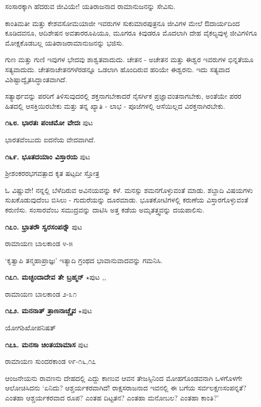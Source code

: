 {ಸಂಸಾರಕ್ಕಾಗಿ ಹೆದರುವ ಜೀವಿಯೇ! ಯತಿರಾಜನಾದ ರಾಮಾನುಜನನ್ನು ಸೇವಿಸು.

ಕಾಂತಿಮತೀ ಮತ್ತು ಕೇಶವಸೋಮಯಾಜೀ ಇವರುಗಳ ಸುಕುಮಾರಪುತ್ರನೂ ಜೀವಿಗಳ ಮೇಲೆ ಔದಾರ್ಯದಿಂದ ಕೂಡಿದವನೂ, ಆದಿಶೇಷನ ಅವತಾರರೂಪಿಯೂ, ಮೂಗರೂ ಕಿವುಡರೂ ಮೊದಲಾಗಿ ದೇಹ ವೈಕಲ್ಯವುಳ್ಳ ಜೀವಿಗಳಿಗೂ ಮೋಕ್ಷಕೊಡಬಲ್ಲ ಯತಿರಾಜರಾಮಾನುಜನನ್ನು ಭಜಿಸು.

ಗುಣ ಮತ್ತು ಗುಣಿ ಇವುಗಳ ಭೇದವು ಶಾಶ್ವತವಾದುದು. ಚೇತನ - ಅಚೇತನ ಮತ್ತು ಈಶ್ವರ ಇವರುಗಳ ಭಿನ್ನತೆಯೂ ಸತ್ಯವಾದುದು. ಚೇತನಾಚೇತನಗಳೆರಡನ್ನೂ ಒಡಲಾಗಿ ಹೊಂದಿರುವ ಹರಿಯೇ ಈಶ್ವರನು. ಇದು ಸತ್ಯವಾದ ವಿಶಿಷ್ಟಾದ್ವೈತಸಿದ್ಧಾಂತವಾಗಿದೆ.

ಸತ್ಯಾರ್ಥವನ್ನು ಪರರಿಗೆ ತಿಳಿಸುವುದರಲ್ಲಿ ಶಕ್ತನಾಗಬೇಕಾದರೆ ನೈಸರ್ಗಿಕ ಪ್ರಜ್ಞಾವಂತನಾಗಬೇಕು, ಅಂತೆಯೇ ಪರರ ಹಿತದಲ್ಲಿ ಆಸಕ್ತಿಯಿರಬೇಕು ಮತ್ತು ತನ್ನ ಖ್ಯಾತಿ - ಲಾಭ - ಪೂಜೆಗಳಲ್ಲಿ ಆಸೆಯಿಲ್ಲದ ವಿರಕ್ತನಾಗಿರಬೇಕು.

\medskip
\noindent\textbf{೧೬೮. ಭಾರತಃ ಪಂಚಮೋ ವೇದಃ} \hfill ಪುಟ \pageref{122}

ಭಾರತವೆಂಬುದು ಐದನೆಯ ವೇದವಾಗಿದೆ.

\medskip
\noindent\textbf{೧೬೯. ಭೂತದಯಾಂ ವಿಸ್ತಾರಯ} \hfill ಪುಟ \pageref{115b}

\hfill ಶ್ರೀಶಂಕರರಭಗವತ್ಪಾದ ಕೃತ ಷಟ್ಪದೀ ಸ್ತೋತ್ರ

ಓ ವಿಷ್ಣುವೇ! ನನ್ನಲ್ಲಿ ಬೆಳೆದಿರುವ ಅವಿನಯವನ್ನು ಕಳೆ. ಮನಸ್ಸು ಶಮನಗೊಳ್ಳುವಂತೆ ಮಾಡು. ಶಬ್ದಾದಿ ವಿಷಯಗಳು ಸುಖಕೊಡುವುದೆಂಬ ಬಿಸಿಲು - ಗುದುರೆಯನ್ನು ದೂರಮಾಡು. ಭೂತಕೋಟಿಗಳಲ್ಲಿ ಕರುಣೆಯ ವಿಸ್ತಾರಗೊಳ್ಳುವಂತೆ ಕರುಣಿಸು. ಸಂಸಾರವೆಂಬ ಸಮುದ್ರವನ್ನು ದಾಟಿಸಿ ಅತ್ತ ಕಡೆಯ ಅಮೃತತ್ತ್ವವನ್ನು ದಯಪಾಲಿಸು.

\medskip
\noindent\textbf{೧೭೦. ಭ್ರಾತರೌ ಸ್ವರಸಂಪನ್ನೌ} \hfill ಪುಟ \pageref{250b}

\hfill ರಾಮಾಯಣ ಬಾಲಕಾಂಡ ೪-೫

`ಕೃತ್ವಾಪಿ ತನ್ಮಹಾಪ್ರಾಜ್ಞಃ' ಇತ್ಯಾದಿ ಗ್ರಂಥದ ಭಾವಾನುವಾದವನ್ನು ಗಮನಿಸಿ.

\medskip
\noindent\textbf{೧೭೧. ಮಚ್ಛಂದಾದೇವ ತೇ ಬ್ರಹ್ಮನ್} $\star$\hfill ಪುಟ \pageref{21a},\pageref{203b},\pageref{250c}

\hfill ರಾಮಾಯಣ ಬಾಲಕಾಂಡ ೨-೩೧

\medskip
\noindent\textbf{೧೭೨. ಮನನಾತ್ ತ್ರಾಣನಾಚ್ಚೈವ} $\star$\hfill ಪುಟ \pageref{10}

\hfill ಯೋಗಶಿಖೋಪನಿಷತ್

\medskip
\noindent\textbf{೧೭೩. ಮನಸಾ ಚಿಂತಯಾಮಾಸ} \hfill ಪುಟ \pageref{192}

\hfill ರಾಮಾಯಣ ಸುಂದರಕಾಂಡ ೪೯-೧೬,೧೭

ಆಂಜನೇಯನು ರಾವಣನು ದೇಹದಲ್ಲಿ ಎದ್ದು ಕಾಣುವ ಆವನ ತೇಜಸ್ಸಿನಿಂದ ಮೋಹಗೊಂಡವನಾಗಿ ಒಳಗೊಳಗೇ ಆಲೋಚಿಸಿದನು `ಏನಿದು? ಆಶ್ಚರ್ಯಕರವಾಗಿದೆ! ರಾಕ್ಷಸರಾಜನಾದ ಇವನಲ್ಲಿ ಈ ಬಗೆಯ ಸರ್ವಲಕ್ಷಣಸಂಪನ್ನತೆ? ಎಂತಹಾ ಆಶ್ಚರ್ಯಕರವಾದ ರೂಪ? ಎಂತಹ ದಿಟ್ಟತನ? ಎಂತಹಾ ಮನೋಬಲ? ಎಂತಹಾ ಕಾಂತಿ?'

}
